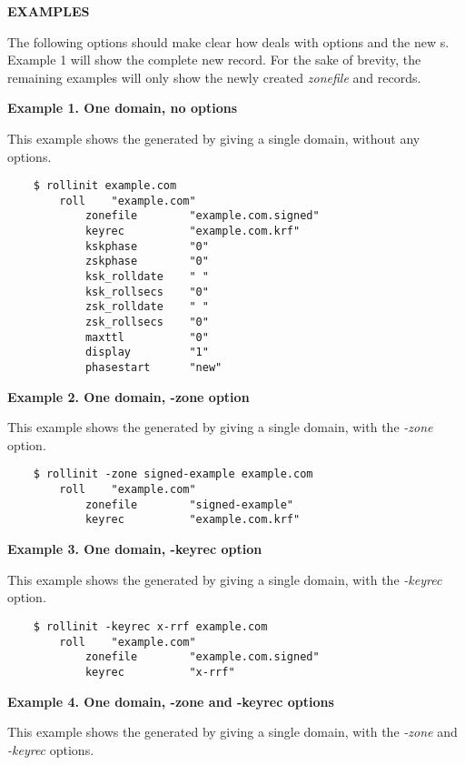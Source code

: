 {\bf EXAMPLES}

The following options should make clear how  deals with options
and the new s.  Example 1 will show the complete new
 record.  For the sake of brevity, the remaining examples will
only show the newly created {\it zonefile} and  records.

{\bf Example 1.  One domain, no options}

This example shows the  generated by giving  a
single domain, without any options.

\begin{verbatim}
    $ rollinit example.com
        roll    "example.com"
            zonefile        "example.com.signed"
            keyrec          "example.com.krf"
            kskphase        "0"
            zskphase        "0"
            ksk_rolldate    " "
            ksk_rollsecs    "0"
            zsk_rolldate    " "
            zsk_rollsecs    "0"
            maxttl          "0"
            display         "1"
            phasestart      "new"
\end{verbatim}

{\bf Example 2.  One domain, -zone option}

This example shows the  generated by giving  a
single domain, with the {\it -zone} option.

\begin{verbatim}
    $ rollinit -zone signed-example example.com
        roll    "example.com"
            zonefile        "signed-example"
            keyrec          "example.com.krf"
\end{verbatim}

{\bf Example 3.  One domain, -keyrec option}

This example shows the  generated by giving  a
single domain, with the {\it -keyrec} option.

\begin{verbatim}
    $ rollinit -keyrec x-rrf example.com
        roll    "example.com"
            zonefile        "example.com.signed"
            keyrec          "x-rrf"
\end{verbatim}

{\bf Example 4.  One domain, -zone and -keyrec options}

This example shows the  generated by giving  a
single domain, with the {\it -zone} and {\it -keyrec} options.

